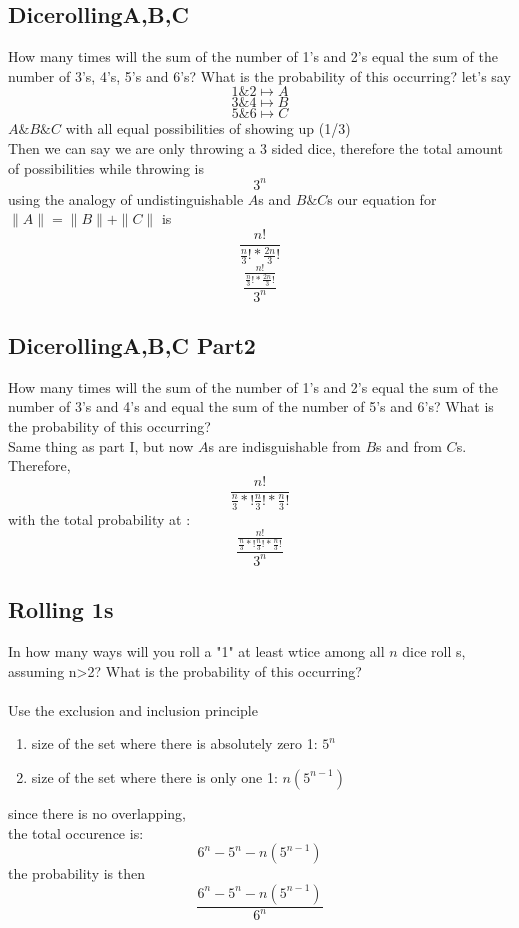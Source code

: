 \documentclass[a4paper,12pt]{article}
\begin{document}
\subsection{DicerollingA,B,C}
How many times will the sum of the number of 1's and 2's equal the
sum of the number of 3's, 4's, 5's and 6's?  What is the probability
of this occurring?
let's say\\
\[ 1 \& 2 \mapsto A\]
\[ 3 \& 4 \mapsto B\]
\[ 5 \& 6 \mapsto C\]
$A \& B \& C$ with all equal possibilities of showing up (1/3)\\
Then we can say we are only throwing a 3 sided dice, therefore the total amount of possibilities while throwing is\\
\[3^n\]
using the analogy of undistinguishable $A$s and $ B\& C$s
our equation for $ \|A\|= \|B\|+\|C\|$
is \\
  \[ \frac{n!}{\frac{n}{3}! * \frac{2n}{3}!}\]
  \[ \frac {\frac{n!}{\frac{n}{3}! * \frac{2n}{3}!}} {3^{n}}\]
\subsection{DicerollingA,B,C Part2}
How many times will the sum of the number of 1's and 2's equal the
sum of the number of 3's and 4's and equal the sum of the number of
5's and 6's?  What is the probability of this occurring?\\
Same thing as part I, but now $A$s are indisguishable from $B$s and from $C$s. Therefore,
  \[\frac{n!}{\frac{n}{3}*!\frac{n}{3}!*\frac{n}{3}!}\]
  with the total probability at :\\
  \[ \frac {\frac{n!}{\frac{n}{3}*!\frac{n}{3}!*\frac{n}{3}!}} {3^{n}}\]
\subsection{Rolling 1s}
In how many ways will you roll a "1" at least wtice among all $n$ dice roll s, assuming n>2? What is the probability of this occurring?\\
\bigskip\\
Use the exclusion and inclusion principle
\begin{enumerate}
  \item{size of the set where there is absolutely zero 1: $5^n$}
  \item{size of the set where there is only one 1: $n(5^{n-1})$}
\end{enumerate}
since there is no overlapping,\\
the total occurence is:
\[6^n - 5^n - n(5^{n-1})\]
the probability is then 
\[\frac{6^n - 5^n - n(5^{n-1})}{6^n}\]
\end{document}
